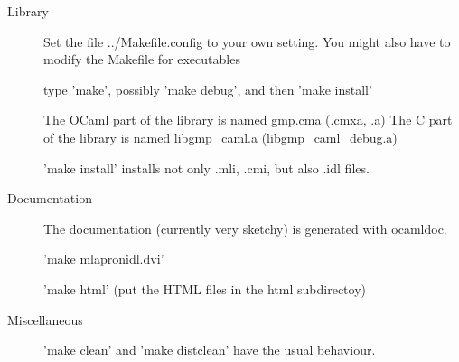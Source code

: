 \documentclass[[twoside,10pt,a4paper]{report}
\begin{document}
\begin{description}
\item[Library]
Set the file ../Makefile.config to your own setting.
You might also have to modify the Makefile for executables

type 'make', possibly 'make debug', and then 'make install'

The OCaml part of the library is named gmp.cma (.cmxa, .a)
The C part of the library is named libgmp\_caml.a (libgmp\_caml\_debug.a)

'make install' installs not only .mli, .cmi, but also .idl files.

\item[Documentation]
The documentation (currently very sketchy) is generated with ocamldoc.

'make mlapronidl.dvi'

'make html' (put the HTML files in the html subdirectoy)

\item[Miscellaneous]
'make clean' and 'make distclean' have the usual behaviour.
\end{description}

\newpage

\tableofcontents



\appendix
\printindex
\end{document}
